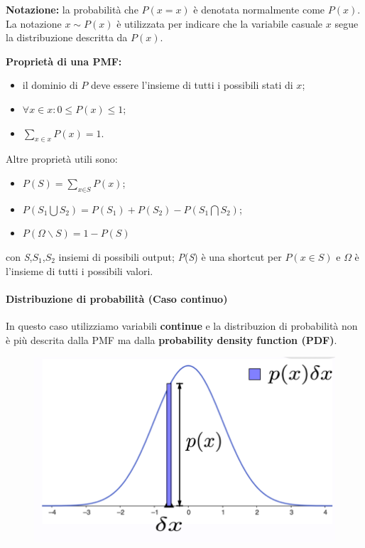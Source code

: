 \textbf{Notazione:} la probabilità che $\textit{P}(x=\textit{x})$ è denotata normalmente come $\textit{P}(x)$. La notazione $x\sim \textit{P}(x)$ è utilizzata per indicare che la variabile casuale $x$ segue la distribuzione descritta da $\textit{P}(x)$.



\textbf{Proprietà di una PMF:}
\begin{itemize}
    \item il dominio di $\textit{P}$ deve essere l'insieme di tutti i possibili stati di $x$;
    \item $\forall \textit{x}\in x:0\leq \textit{P}(\textit{x})\leq 1$;
    \item $\sum_{\textit{x}\in x}\textit{P}(\textit{x})=1$.
\end{itemize}
Altre proprietà utili sono:
\begin{itemize}
    \item $\textit{P}(\textit{S})=\sum_{\textit{x}\in \textit{S}}\textit{P}(\textit{x})$;
    \item $\textit{P}(\textit{$S_1$}\bigcup \textit{$S_2$})=\textit{P}(\textit{$S_1$})+\textit{P}(\textit{$S_2$})-\textit{P}(\textit{$S_1$}\bigcap \textit{$S_2$})$;
    \item $\textit{P}(\Omega \backslash \textit{S})=1-\textit{P}(\textit{S})$
\end{itemize}
con \textit{S},\textit{$S_1$},\textit{$S_2$} insiemi di possibili output; \textit{P}(\textit{S}) è una shortcut per $\textit{P}(x\in \textit{S})$ e $\Omega$ è l'insieme di tutti i possibili valori.


\paragraph{Distribuzione di probabilità (Caso continuo)}
In questo caso utilizziamo variabili \textbf{continue} e la distribuzion di probabilità non è più descrita dalla PMF ma dalla \textbf{probability density function (PDF)}.
\begin{figure}[!h]
    \includegraphics[scale=.5]{images/prerequisites/pdf.png}
    \centering
\end{figure}


